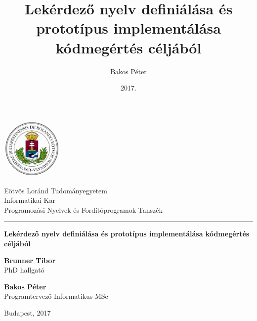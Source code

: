 \documentclass[a4paper,12pt]{report}
\title { Lekérdező nyelv definiálása és prototípus implementálása kódmegértés céljából }
\author { Bakos Péter }
\date { 2017. }
\begin{document}
\begin{titlepage}
	
	\begin{minipage}{0.40\linewidth}
		\includegraphics[width=30mm,keepaspectratio]{ELTE_logo.png}
	\end{minipage}
	\begin{minipage}{0.50\linewidth}
		\begin{center}
			Eötvös Loránd Tudományegyetem \\
			Informatikai Kar \\
			Programozási Nyelvek és Fordítóprogramok Tanszék
		\end{center}
	\end{minipage}
	
	\hrule
	\vfill
	
	\begin{center}
		\Huge
		\textbf{Lekérdező nyelv definiálása és prototípus implementálása kódmegértés céljából}
		\normalsize
	\end{center}
	
	\vfill
	
	\begin{minipage}[t]{0.5\linewidth}
		\begin{flushleft}
			\textbf{Brunner Tibor} \\
			PhD hallgató
		\end{flushleft}
	\end{minipage}
	\begin{minipage}[t]{0.5\linewidth}
		\begin{flushright}
			\textbf{Bakos Péter} \\
			Programtervező Informatikus MSc
		\end{flushright}
	\end{minipage}
	
	\vfill
	
	\begin{center}
		Budapest, 2017
	\end{center}
	
\end{titlepage}


\tableofcontents
\thispagestyle{empty}
\end{document}

